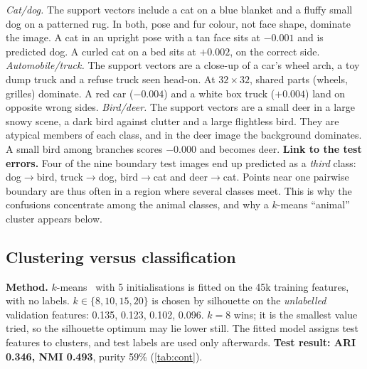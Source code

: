 \documentclass[10pt,twocolumn,letterpaper]{article}
\begin{document}
\textit{Cat/dog.} The support vectors include a cat on a blue blanket and a fluffy small dog on a patterned rug.
In both, pose and fur colour, not face shape, dominate the image.
A cat in an upright pose with a tan face sits at $-0.001$ and is predicted dog.
A curled cat on a bed sits at $+0.002$, on the correct side.
\textit{Automobile/truck.} The support vectors are a close-up of a car's wheel arch, a toy dump truck and a refuse truck seen head-on.
At $32{\times}32$, shared parts (wheels, grilles) dominate.
A red car ($-0.004$) and a white box truck ($+0.004$) land on opposite wrong sides.
\textit{Bird/deer.} The support vectors are a small deer in a large snowy scene, a dark bird against clutter and a large flightless bird.
They are atypical members of each class, and in the deer image the background dominates.
A small bird among branches scores $-0.000$ and becomes deer.
\textbf{Link to the test errors.} Four of the nine boundary test images end up predicted as a \emph{third} class: dog$\to$bird, truck$\to$dog, bird$\to$cat and deer$\to$cat.
Points near one pairwise boundary are thus often in a region where several classes meet.
This is why the confusions concentrate among the animal classes, and why a $k$-means ``animal'' cluster appears below.

\subsection{Clustering versus classification}
\textbf{Method.} $k$-means~\cite{lloyd1982kmeans} with 5 initialisations is fitted on the 45k training features, with no labels.
$k\in\{8,10,15,20\}$ is chosen by silhouette on the \emph{unlabelled} validation features: 0.135, 0.123, 0.102, 0.096.
\textbf{$k{=}8$} wins; it is the smallest value tried, so the silhouette optimum may lie lower still.
The fitted model assigns test features to clusters, and test labels are used only afterwards.
\textbf{Test result: ARI 0.346, NMI 0.493}, purity 59\% (\cref{tab:cont}).
\end{document}
